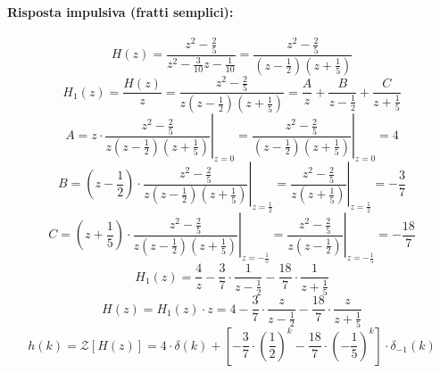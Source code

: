 \documentclass[a4paper]{article}
\begin{document}
	\paragraph{Risposta impulsiva (fratti semplici):}
	\[ H(z) = \frac{z^2 - \frac{2}{5}}{z^2 - \frac{3}{10} z - \frac{1}{10}} = \frac{z^2 - \frac{2}{5}}{(z - \frac{1}{2})(z + \frac{1}{5})} \]
	\[ H_1(z) = \frac{H(z)}{z} = \frac{z^2 - \frac{2}{5}}{z(z - \frac{1}{2})(z + \frac{1}{5})} = \frac{A}{z} + \frac{B}{z - \frac{1}{2}} + \frac{C}{z + \frac{1}{5}} \]
	\[
	A = \left. z \cdot \frac{z^2 - \frac{2}{5}}{z(z - \frac{1}{2})(z + \frac{1}{5})} \right|_{z=0} = \left. \frac{z^2 - \frac{2}{5}}{(z - \frac{1}{2})(z + \frac{1}{5})} \right|_{z=0} = 4
	\]
	\[
	B = \left. \left( z - \frac{1}{2} \right) \cdot \frac{z^2 - \frac{2}{5}}{z(z - \frac{1}{2})(z + \frac{1}{5})} \right|_{z = \frac{1}{2}} = \left. \frac{z^2 - \frac{2}{5}}{z(z + \frac{1}{5})} \right|_{z = \frac{1}{2}} = - \frac{3}{7}
	\]
	\[
	C = \left. \left( z + \frac{1}{5} \right) \cdot \frac{z^2 - \frac{2}{5}}{z(z - \frac{1}{2})(z + \frac{1}{5})} \right|_{z = - \frac{1}{5}} = \left. \frac{z^2 - \frac{2}{5}}{z(z - \frac{1}{2})} \right|_{z = - \frac{1}{5}} = - \frac{18}{7}
	\]
	\[ H_1(z) = \frac{4}{z} - \frac{3}{7} \cdot \frac{1}{z - \frac{1}{2}} - \frac{18}{7} \cdot \frac{1}{z + \frac{1}{5}} \]
	\[ H(z) = H_1(z) \cdot z = 4 - \frac{3}{7} \cdot \frac{z}{z - \frac{1}{2}} - \frac{18}{7} \cdot \frac{z}{z + \frac{1}{5}} \]
	\[
	h(k) = \mathcal{Z} [H(z)] = 4 \cdot \delta(k) + \left[ - \frac{3}{7} \cdot \left( \frac{1}{2} \right)^k - \frac{18}{7} \cdot \left( - \frac{1}{5} \right)^k \right] \cdot \delta_{-1}(k)
	\]
	
\end{document}

